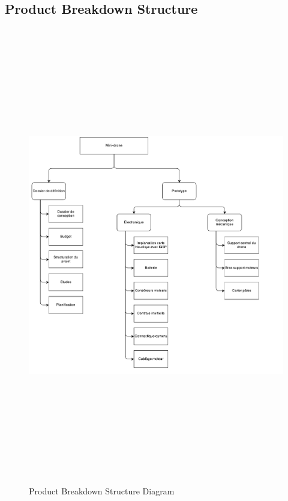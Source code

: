 \documentclass[a4paper, 12pt, leqno]{report}
\theoremstyle{plain}
\begin{document}
\begin{landscape}
        \section{Product Breakdown Structure}
        \begin{figure}[H]
           \begin{center}
           \includegraphics[height=200mm, width=140mm, angle=90]{Files/PBS.pdf}
           \end{center}
           \caption{Product Breakdown Structure Diagram}
           \label{Product Breakdown Structure Diagram}
           \end{figure}
           

\end{landscape}
\end{document}
